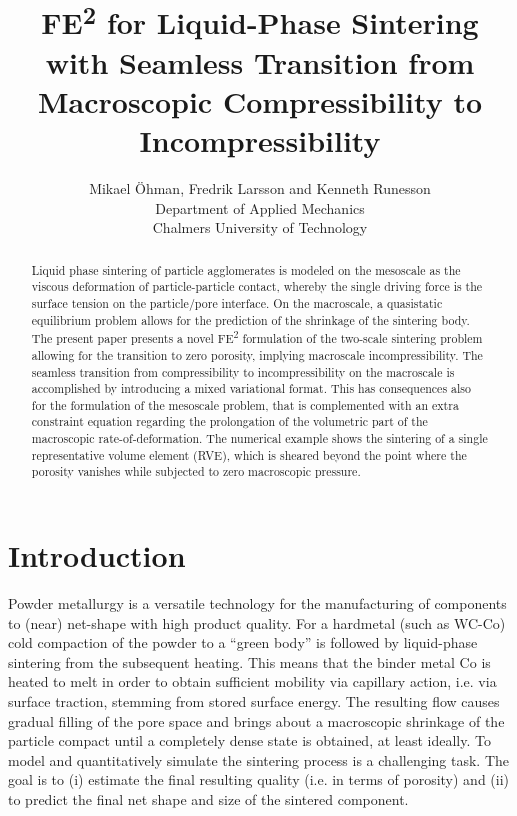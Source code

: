 \documentclass[12pt,a4paper,fleqn]{article}
\begin{document}
\title{FE\textsuperscript{2} for Liquid-Phase Sintering with Seamless Transition from Macroscopic Compressibility to Incompressibility}

\author{
Mikael Öhman, Fredrik Larsson and Kenneth Runesson\\
Department of Applied Mechanics \\
Chalmers University of Technology}

\maketitle

\begin{abstract}
\noindent
Liquid phase sintering of particle agglomerates is modeled on the mesoscale as the viscous deformation of particle-particle contact, whereby the single driving force is the surface tension on the particle/pore interface.
On the macroscale, a quasistatic equilibrium problem allows for the prediction of the shrinkage of the sintering body. 
The present paper presents a novel FE\textsuperscript{2} formulation of the two-scale sintering problem allowing for the transition to zero porosity, implying macroscale incompressibility.
The seamless transition from compressibility to incompressibility on the macroscale is accomplished by introducing a mixed variational format.
This has consequences also for the formulation of the mesoscale problem, that is complemented with an extra constraint equation regarding the prolongation of the volumetric part of the macroscopic rate-of-deformation.
The numerical example shows the sintering of a single representative volume element (RVE), which is sheared beyond the point where the porosity vanishes while subjected to zero macroscopic pressure.

\end{abstract}

\section{Introduction}

Powder metallurgy is a versatile technology for the manufacturing of components to (near) net-shape with high product quality. For a hardmetal (such as WC-Co) cold compaction of the powder to a ``green body'' is followed by liquid-phase sintering from the subsequent heating.
This means that the binder metal Co is heated to melt in order to obtain sufficient mobility via capillary action, i.e. via surface traction, stemming from stored surface energy.
The resulting flow causes gradual filling of the pore space and brings about a macroscopic shrinkage of the particle compact until a completely dense state is obtained, at least ideally. To model and quantitatively simulate the sintering process is a challenging task. The goal is to (i) estimate the final resulting quality (i.e. in terms of porosity) and (ii) to predict the final net shape and size of the sintered component.
\end{document}
